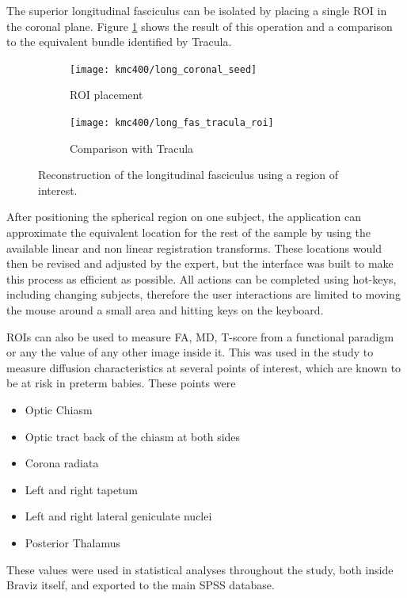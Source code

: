 The superior longitudinal fasciculus can be isolated by placing a single ROI in the coronal plane. Figure \ref{fig_long_fasc} shows the result of this operation and a comparison to the equivalent bundle identified by Tracula. 

\begin{figure}
\centering
	\begin{subfigure}{0.45\textwidth}
		\texttt{[image: kmc400/long\_coronal\_seed]}
		\caption{ROI placement}
	\end{subfigure}
	\begin{subfigure}{0.45\textwidth}
\texttt{[image: kmc400/long\_fas\_tracula\_roi]}
		\caption{Comparison with Tracula}
	\end{subfigure}

\caption{Reconstruction of the longitudinal fasciculus using a region of interest.
\label{fig_long_fasc}}
\end{figure} 

After positioning the spherical region on one subject, the application can approximate the equivalent location for the rest of the sample by using the available linear and non linear registration transforms. These locations would then be revised and adjusted by the expert, but the interface was built to make this process as efficient as possible. All actions can be completed using hot-keys, including changing subjects, therefore the user interactions are limited to moving the mouse around a small area and hitting keys on the keyboard.

ROIs can also be used to measure FA, MD, T-score from a functional paradigm or any the value of any other image inside it. This was used in the study to measure diffusion characteristics at several points of interest, which are known to be at risk in preterm babies. These points were

\begin{itemize}
\item Optic Chiasm
\item Optic tract back of the chiasm at both sides
\item Corona radiata
\item Left and right tapetum
\item Left and right lateral geniculate nuclei
\item Posterior Thalamus
\end{itemize}

These values were used in statistical analyses throughout the study, both inside Braviz itself, and exported to the main SPSS database.

